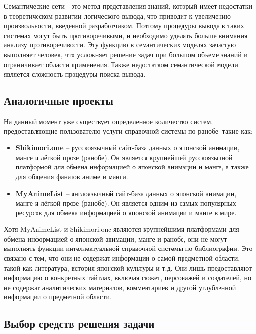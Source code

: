 Семантические сети - это метод представления знаний, который имеет недостатки в теоретическом развитии логического вывода, что приводит к увеличению произвольности, введенной разработчиком. Поэтому процедуры вывода в таких системах могут быть противоречивыми, и необходимо уделять больше внимания анализу противоречивости. Эту функцию в семантических моделях зачастую выполняет человек, что усложняет решение задач при большом объеме знаний и ограничивает области применения. \cite[с.~18]{Model_Baryshev} Также недостатком семантической модели является сложность процедуры поиска вывода. \cite[с.~23]{KBIS_Gavrilova}

\subsection{Аналогичные проекты}

На данный момент уже существует определенное количество систем, предоставляющие пользователю услуги справочной системы по ранобе, такие как:
\begin{itemize}
    \item \textbf{Shikimori.one} -- русскоязычный сайт-база данных о японской анимации, манге и лёгкой прозе (ранобе). Он является крупнейшей русскоязычной платформой для обмена информацией о японской анимации и манге, а также для общения фанатов аниме и манги. \cite{Shikimori}
    \item \textbf{MyAnimeList} -- англоязычный сайт-база данных о японской анимации, манге и лёгкой прозе (ранобе). Он является одним из самых популярных ресурсов для обмена информацией о японской анимации и манге в мире. \cite{MAL}
\end{itemize}

Хотя MyAnimeList и Shikimori.one являются крупнейшими платформами для обмена информацией о японской анимации, манге и ранобе, они не могут выполнять функции интеллектуальной справочной системы по библиографии. Это связано с тем, что они не содержат информации о самой предметной области, такой как литература, история японской культуры и т.д. Они лишь предоставляют информацию о конкретных тайтлах, включая сюжет, персонажей и создателей, но не содержат аналитических материалов, комментариев и другой углубленной информации о предметной области.

\subsection{Выбор средств решения задачи}

